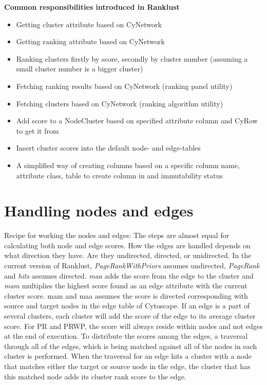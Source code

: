 \textbf{Common responsibilities introduced in Ranklust}

\begin{itemize}
    \item Getting cluster attribute based on CyNetwork
    \item Getting ranking attribute based on CyNetwork
    \item Ranking clusters firstly by score, secondly by cluster number
        (assuming a small cluster number is a bigger cluster)
    \item Fetching ranking results based on CyNetwork (ranking panel utility)
    \item Fetching clusters based on CyNetwork (ranking algorithm utility)
    \item Add score to a NodeCluster based on specified attribute column and
        CyRow to get it from
    \item Insert cluster scores into the default node- and edge-tables
    \item A simplified way of creating columns based on a specific column name,
        attribute class, table to create column in and immutability status
\end{itemize}

\section{Handling nodes and edges}
Recipe for working the nodes and edges: The steps are almost equal for
calculating both node and edge scores. How the edges are handled depends on what
direction they have. Are they undirected, directed, or unidirected. In the
current version of Ranklust, \textit{PageRankWithPriors} assumes undirected,
\textit{PageRank} and \textit{\gls{hits}} assumes directed. \textit{\gls{maa}}
adds the score from the edge to the cluster and \textit{\gls{mam}} multiplies
the highest score found as an edge attribute with the current cluster score.
\gls{mam} and \gls{maa} assumes the score is directed corresponding with source
and target nodes in the edge table of Cytoscape. If an edge is a part of
several clusters, each cluster will add the score of the edge to its average
cluster score. For PR and PRWP, the score will always reside within nodes and
not edges at the end of execution. To distribute the scores among the edges, a
traversal through all of the edges, which is being matched against all of the
nodes in each cluster is performed. When the traversal for an edge hits a
cluster with a node that matches either the target or source node in the edge,
the cluster that has this matched node adds its cluster rank score to the edge.

